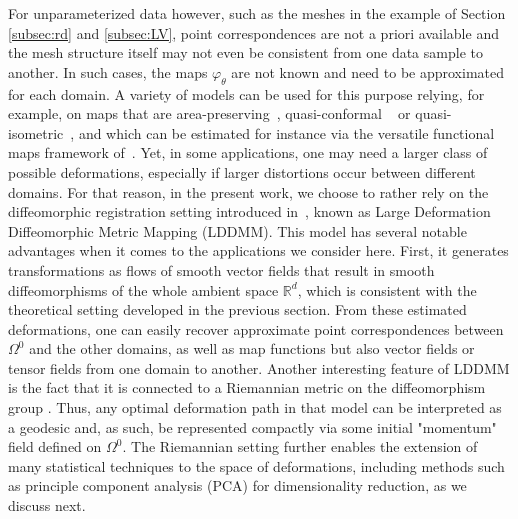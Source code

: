 \documentclass[review]{elsarticle}
\def\refd{0}
\def\Omegaref{{\Omega^\refd}}
\begin{document}
For unparameterized data however, such as the meshes in the example of Section \ref{subsec:rd} and \ref{subsec:LV}, point correspondences are not a priori available and the mesh structure itself may not even be consistent from one data sample to another. In such cases, the maps $\varphi_{\theta}$ are not known and need to be approximated for each domain. A variety of models can be used for this purpose relying, for example, on maps that are area-preserving~\cite{desbrun2002intrinsic}, {quasi-conformal} ~\cite{praun2003spherical,choi2022recent} or {quasi-isometric}~\cite{sun2008quasi}, and which can be estimated for instance via the versatile functional maps framework of~\cite{ovsjanikov2012functional,ovsjanikov2016computing}. Yet, in some applications, one may need a larger class of possible deformations, especially if larger distortions occur between different domains. For that reason, in the present work, we choose to rather rely on the diffeomorphic registration setting introduced in~\cite{beg2005computing}, known as Large Deformation Diffeomorphic Metric Mapping (LDDMM). This model has several notable advantages when it comes to the applications we consider here. First, it generates transformations as flows of smooth vector fields that result in smooth diffeomorphisms of the whole ambient space $\mathbb{R}^d$, which is consistent with the theoretical setting developed in the previous section. From these estimated deformations, one can easily recover approximate point correspondences between $\Omegaref$ and the other domains, as well as map functions but also vector fields or tensor fields from one domain to another. Another interesting feature of LDDMM is the fact that it is connected to a Riemannian metric on the diffeomorphism group \cite{younes2019shapes}. Thus, any optimal deformation path in that model can be interpreted as a geodesic and, as such, be represented compactly via some initial "momentum" field defined on $\Omegaref$. The Riemannian setting further enables the extension of many statistical techniques to the space of deformations, including methods such as principle component analysis (PCA) for dimensionality reduction, as we discuss next.
\end{document}
